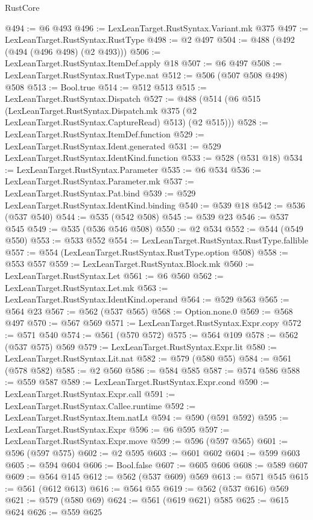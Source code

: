 \begin{lexlean}{RustCore}
\begin{coremodule}
@494 := @6 @493
@496 := LexLeanTarget.RustSyntax.Variant.mk @375
@497 := LexLeanTarget.RustSyntax.RustType
@498 := @2 @497
@504 := @488 (@492 (@494 (@496 @498) (@2 @493)))
@506 := LexLeanTarget.RustSyntax.ItemDef.apply @18
@507 := @6 @497
@508 := LexLeanTarget.RustSyntax.RustType.nat
@512 := @506 (@507 @508 @498) @508
@513 := Bool.true
@514 := @512 @513
@515 := LexLeanTarget.RustSyntax.Dispatch
@527 := @488
    (@514
      (@6
        @515
        (LexLeanTarget.RustSyntax.Dispatch.mk @375 (@2 LexLeanTarget.RustSyntax.CaptureRead) @513)
        (@2 @515)))
@528 := LexLeanTarget.RustSyntax.ItemDef.function
@529 := LexLeanTarget.RustSyntax.Ident.generated
@531 := @529 LexLeanTarget.RustSyntax.IdentKind.function
@533 := @528 (@531 @18)
@534 := LexLeanTarget.RustSyntax.Parameter
@535 := @6 @534
@536 := LexLeanTarget.RustSyntax.Parameter.mk
@537 := LexLeanTarget.RustSyntax.Pat.bind
@539 := @529 LexLeanTarget.RustSyntax.IdentKind.binding
@540 := @539 @18
@542 := @536 (@537 @540)
@544 := @535 (@542 @508)
@545 := @539 @23
@546 := @537 @545
@549 := @535 (@536 @546 @508)
@550 := @2 @534
@552 := @544 (@549 @550)
@553 := @533 @552
@554 := LexLeanTarget.RustSyntax.RustType.fallible
@557 := @554 (LexLeanTarget.RustSyntax.RustType.option @508)
@558 := @553 @557
@559 := LexLeanTarget.RustSyntax.Block.mk
@560 := LexLeanTarget.RustSyntax.Let
@561 := @6 @560
@562 := LexLeanTarget.RustSyntax.Let.mk
@563 := LexLeanTarget.RustSyntax.IdentKind.operand
@564 := @529 @563
@565 := @564 @23
@567 := @562 (@537 @565)
@568 := Option.none.{0}
@569 := @568 @497
@570 := @567 @569
@571 := LexLeanTarget.RustSyntax.Expr.copy
@572 := @571 @540
@574 := @561 (@570 @572)
@575 := @564 @109
@578 := @562 (@537 @575) @569
@579 := LexLeanTarget.RustSyntax.Expr.lit
@580 := LexLeanTarget.RustSyntax.Lit.nat
@582 := @579 (@580 @55)
@584 := @561 (@578 @582)
@585 := @2 @560
@586 := @584 @585
@587 := @574 @586
@588 := @559 @587
@589 := LexLeanTarget.RustSyntax.Expr.cond
@590 := LexLeanTarget.RustSyntax.Expr.call
@591 := LexLeanTarget.RustSyntax.Callee.runtime
@592 := LexLeanTarget.RustSyntax.Item.natLt
@594 := @590 (@591 @592)
@595 := LexLeanTarget.RustSyntax.Expr
@596 := @6 @595
@597 := LexLeanTarget.RustSyntax.Expr.move
@599 := @596 (@597 @565)
@601 := @596 (@597 @575)
@602 := @2 @595
@603 := @601 @602
@604 := @599 @603
@605 := @594 @604
@606 := Bool.false
@607 := @605 @606
@608 := @589 @607
@609 := @564 @145
@612 := @562 (@537 @609) @569
@613 := @571 @545
@615 := @561 (@612 @613)
@616 := @564 @55
@619 := @562 (@537 @616) @569
@621 := @579 (@580 @69)
@624 := @561 (@619 @621) @585
@625 := @615 @624
@626 := @559 @625

\end{coremodule}
\end{lexlean}
